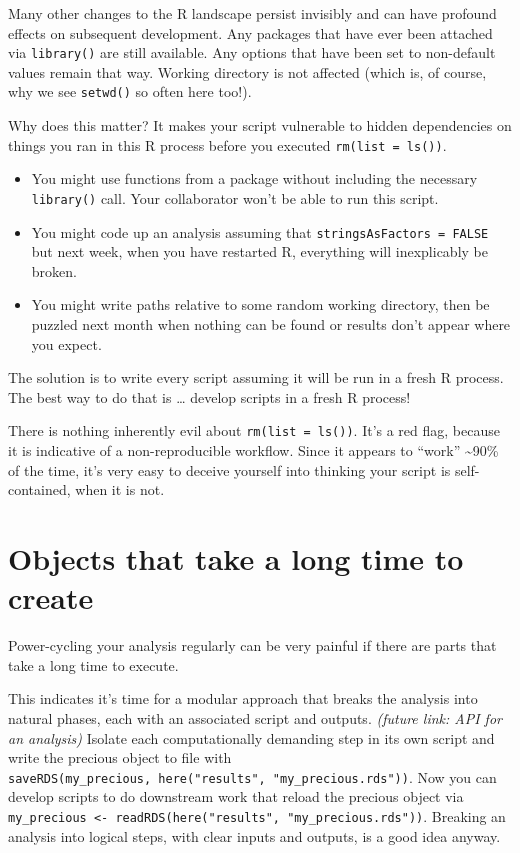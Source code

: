 \documentclass[
  letterpaper,
]{book}
\providecommand{\tightlist}{%
  \setlength{\itemsep}{0pt}\setlength{\parskip}{0pt}}\usepackage{longtable,booktabs,array}
\begin{document}
Many other changes to the R landscape persist invisibly and can have
profound effects on subsequent development. Any packages that have ever
been attached via \texttt{library()} are still available. Any options
that have been set to non-default values remain that way. Working
directory is not affected (which is, of course, why we see
\texttt{setwd()} so often here too!).

Why does this matter? It makes your script vulnerable to hidden
dependencies on things you ran in this R process before you executed
\texttt{rm(list\ =\ ls())}.

\begin{itemize}
\tightlist
\item
  You might use functions from a package without including the necessary
  \texttt{library()} call. Your collaborator won't be able to run this
  script.
\item
  You might code up an analysis assuming that
  \texttt{stringsAsFactors\ =\ FALSE} but next week, when you have
  restarted R, everything will inexplicably be broken.
\item
  You might write paths relative to some random working directory, then
  be puzzled next month when nothing can be found or results don't
  appear where you expect.
\end{itemize}

The solution is to write every script assuming it will be run in a fresh
R process. The best way to do that is \ldots{} develop scripts in a
fresh R process!

There is nothing inherently evil about \texttt{rm(list\ =\ ls())}. It's
a red flag, because it is indicative of a non-reproducible workflow.
Since it appears to ``work'' \textasciitilde90\% of the time, it's very
easy to deceive yourself into thinking your script is self-contained,
when it is not.

\hypertarget{objects-that-take-a-long-time-to-create}{%
\section*{Objects that take a long time to
create}\label{objects-that-take-a-long-time-to-create}}

Power-cycling your analysis regularly can be very painful if there are
parts that take a long time to execute.

This indicates it's time for a modular approach that breaks the analysis
into natural phases, each with an associated script and outputs.
\emph{(future link: API for an analysis)} Isolate each computationally
demanding step in its own script and write the precious object to file
with
\texttt{saveRDS(my\_precious,\ here("results",\ "my\_precious.rds"))}.
Now you can develop scripts to do downstream work that reload the
precious object via
\texttt{my\_precious\ \textless{}-\ readRDS(here("results",\ "my\_precious.rds"))}.
Breaking an analysis into logical steps, with clear inputs and outputs,
is a good idea anyway.
\end{document}
